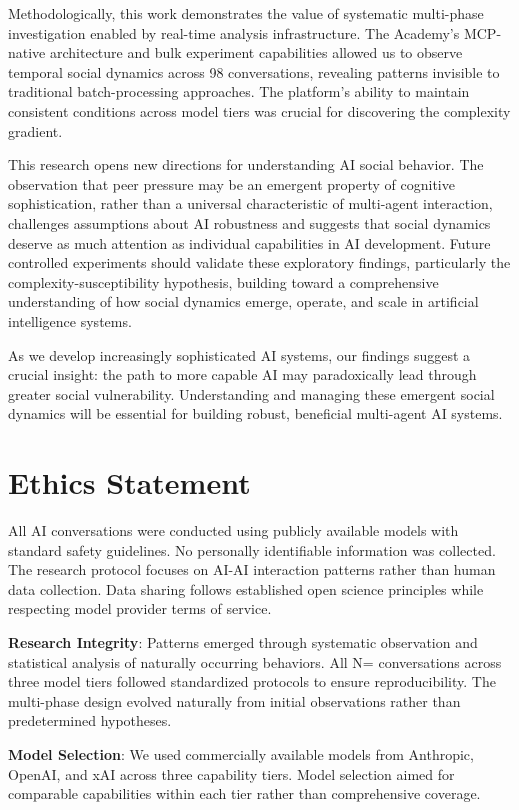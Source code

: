 \documentclass[11pt,letterpaper]{article}
\newcommand{\theacademy}{The Academy}
\newcommand{\exponedataTotalSessionsRaw}{37}
\newcommand{\exptwoTotalSessionsRaw}{31}
\newcommand{\expthreeTotalSessionsRaw}{30}
\newcommand{\totalAllPhasesRaw}{\fpeval{\exponedataTotalSessionsRaw + \exptwoTotalSessionsRaw + \expthreeTotalSessionsRaw}}
\newcommand{\totalAllPhases}{N=\totalAllPhasesRaw}
\begin{document}
Methodologically, this work demonstrates the value of systematic multi-phase investigation enabled by real-time analysis infrastructure. \theacademy{}'s MCP-native architecture and bulk experiment capabilities allowed us to observe temporal social dynamics across 98 conversations, revealing patterns invisible to traditional batch-processing approaches. The platform's ability to maintain consistent conditions across model tiers was crucial for discovering the complexity gradient.

This research opens new directions for understanding AI social behavior. The observation that peer pressure may be an emergent property of cognitive sophistication, rather than a universal characteristic of multi-agent interaction, challenges assumptions about AI robustness and suggests that social dynamics deserve as much attention as individual capabilities in AI development. Future controlled experiments should validate these exploratory findings, particularly the complexity-susceptibility hypothesis, building toward a comprehensive understanding of how social dynamics emerge, operate, and scale in artificial intelligence systems.

As we develop increasingly sophisticated AI systems, our findings suggest a crucial insight: the path to more capable AI may paradoxically lead through greater social vulnerability. Understanding and managing these emergent social dynamics will be essential for building robust, beneficial multi-agent AI systems.

\section{Ethics Statement}

All AI conversations were conducted using publicly available models with standard safety guidelines. No personally identifiable information was collected. The research protocol focuses on AI-AI interaction patterns rather than human data collection. Data sharing follows established open science principles while respecting model provider terms of service.

\textbf{Research Integrity}: Patterns emerged through systematic observation and statistical analysis of naturally occurring behaviors. All \totalAllPhases{} conversations across three model tiers followed standardized protocols to ensure reproducibility. The multi-phase design evolved naturally from initial observations rather than predetermined hypotheses.

\textbf{Model Selection}: We used commercially available models from Anthropic, OpenAI, and xAI across three capability tiers. Model selection aimed for comparable capabilities within each tier rather than comprehensive coverage.
\end{document}
